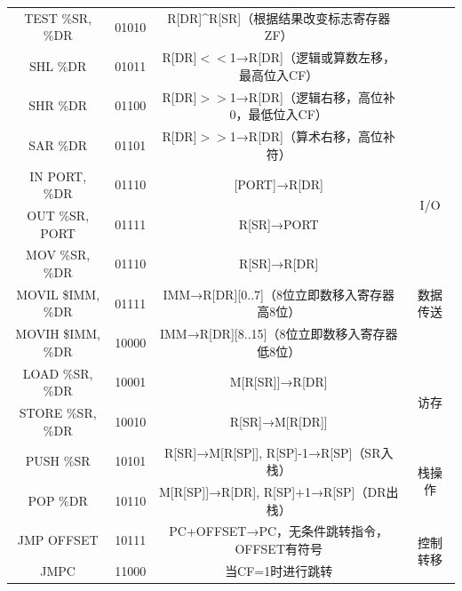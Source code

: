 \documentclass[titlepage, 11pt]{article}
\begin{document}
\begin{table}[H]
\begin{tabular}{c|c|c|c}
			TEST \%SR, \%DR   & 01010 & R{[}DR{]}\textasciicircum R{[}SR{]}（根据结果改变标志寄存器ZF）             &                        \\ \cline{1-3}
			SHL \%DR          & 01011 & R{[}DR{]}$<<$1→R{[}DR{]}（逻辑或算数左移，最高位入CF）         &                        \\ \cline{1-3}
			SHR \%DR          & 01100 & R{[}DR{]}$>>$1→R{[}DR{]}（逻辑右移，高位补0，最低位入CF） &                        \\ \cline{1-3}
			SAR \%DR          & 01101 & R{[}DR{]}$>>$1→R{[}DR{]}（算术右移，高位补符）        &                        \\ \hline
			IN PORT, \%DR     & 01110 & {[}PORT{]}→R{[}DR{]}                                           & \multirow{2}{*}{I/O}   \\ \cline{1-3}
			OUT \%SR, PORT    & 01111 & R{[}SR{]}→PORT                                                 &                        \\ \hline
			MOV \%SR, \%DR    & 01110 & R{[}SR{]}→R{[}DR{]}                                            & \multirow{3}{*}{数据传送}  \\ \cline{1-3}
			MOVIL \$IMM, \%DR & 01111 & IMM→R{[}DR{]}{[}0..7{]}（8位立即数移入寄存器高8位）                         &                        \\ \cline{1-3}
			MOVIH \$IMM, \%DR & 10000 & IMM→R{[}DR{]}{[}8..15{]}（8位立即数移入寄存器低8位）                        &                        \\ \hline
			LOAD \%SR, \%DR   & 10001 & M{[}R{[}SR{]}{]}→R{[}DR{]}                                     & \multirow{2}{*}{访存}    \\ \cline{1-3}
			STORE \%SR, \%DR  & 10010 & R{[}SR{]}→M{[}R{[}DR{]}{]}                                     &                        \\ \hline
			PUSH \%SR         & 10101 & R{[}SR{]}→M{[}R{[}SP{]}{]}, R{[}SP{]}-1→R{[}SP{]}（SR入栈）        & \multirow{2}{*}{栈操作}   \\ \cline{1-3}
			POP \%DR          & 10110 & M{[}R{[}SP{]}{]}→R{[}DR{]}, R{[}SP{]}+1→R{[}SP{]}（DR出栈）        &                        \\ \hline
			JMP OFFSET       & 10111 & PC+OFFSET→PC，无条件跳转指令，OFFSET有符号                                 & \multirow{7}{*}{控制转移}  \\ \cline{1-3}
			JMPC              & 11000 & 当CF=1时进行跳转                                                     &                        \\ \cline{1-3}

\end{tabular}
\end{table}
\end{document}
